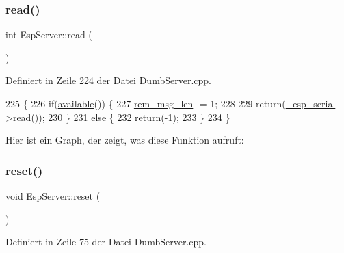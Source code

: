 \subsubsection{\texorpdfstring{read()}{read()}}
{\footnotesize\ttfamily int Esp\+Server\+::read (\begin{DoxyParamCaption}{ }\end{DoxyParamCaption})\hspace{0.3cm}{\ttfamily [virtual]}}



Definiert in Zeile 224 der Datei Dumb\+Server.\+cpp.


\begin{DoxyCode}
225 \{
226   \textcolor{keywordflow}{if}(\hyperlink{class_esp_server_aad68b4972f6b8426004feeef6e98d02d}{available}()) \{
227     \hyperlink{class_esp_server_a0cff51089b75a6edf347b86727683e7f}{rem\_msg\_len} -= 1;
228 
229     \textcolor{keywordflow}{return}(\hyperlink{class_esp_server_a33166aa92db341d47cdf1776492cca62}{\_esp\_serial}->read());
230   \}
231   \textcolor{keywordflow}{else} \{
232     \textcolor{keywordflow}{return}(-1);
233   \}
234 \}
\end{DoxyCode}
Hier ist ein Graph, der zeigt, was diese Funktion aufruft\+:
\mbox{\label{class_esp_server_aeabfb2610ecfdc26e8ce0e624221067f}} 
\subsubsection{\texorpdfstring{reset()}{reset()}}
{\footnotesize\ttfamily void Esp\+Server\+::reset (\begin{DoxyParamCaption}{ }\end{DoxyParamCaption})\hspace{0.3cm}{\ttfamily [private]}}



Definiert in Zeile 75 der Datei Dumb\+Server.\+cpp.



